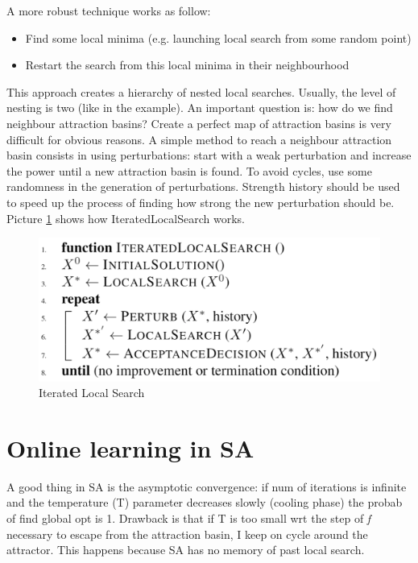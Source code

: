 \documentclass[10pt]{article}
\begin{document}
A more robust technique works as follow:
\begin{itemize}
\item{Find some local minima (e.g. launching local search from some random point)}
\item{Restart the search from this local minima in their neighbourhood}
\end{itemize}
This approach creates a hierarchy of nested local searches. Usually, the level of nesting is two (like in the example). An important question is: how do we find neighbour attraction basins? Create a perfect map of attraction basins is very difficult for obvious reasons. A simple method to reach a neighbour attraction basin consists in using perturbations: start with a weak perturbation and increase the power until a new attraction basin is found. To avoid cycles, use some randomness in the generation of perturbations. Strength history should be used to speed up the process of finding how strong the new perturbation should be.
Picture \ref{fig:ils} shows how IteratedLocalSearch works.

\begin{figure}[H]
\includegraphics[scale=0.25]{ils}
\caption{Iterated Local Search}
\centering
\label{fig:ils}
\end{figure}

\section{Online learning in SA}
A good thing in SA is the asymptotic convergence: if num of iterations is infinite and the temperature (T) parameter decreases slowly (cooling phase) the probab of find global opt is 1. Drawback is that if T is too small wrt the step of \textit{f} necessary to escape from the attraction basin, I keep on cycle around the attractor. This happens because SA has no memory of past local search. 
\end{document}
